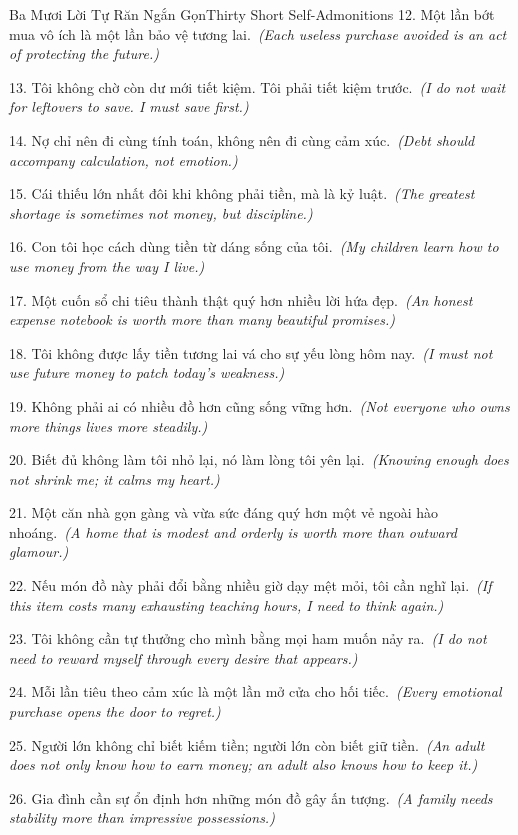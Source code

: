 \begin{truyen}{Ba Mươi Lời Tự Răn Ngắn Gọn}{Thirty Short Self-Admonitions}
12. Một lần bớt mua vô ích là một lần bảo vệ tương lai.\
\textit{(Each useless purchase avoided is an act of protecting the future.)}

13. Tôi không chờ còn dư mới tiết kiệm. Tôi phải tiết kiệm trước.\
\textit{(I do not wait for leftovers to save. I must save first.)}

14. Nợ chỉ nên đi cùng tính toán, không nên đi cùng cảm xúc.\
\textit{(Debt should accompany calculation, not emotion.)}

15. Cái thiếu lớn nhất đôi khi không phải tiền, mà là kỷ luật.\
\textit{(The greatest shortage is sometimes not money, but discipline.)}

16. Con tôi học cách dùng tiền từ dáng sống của tôi.\
\textit{(My children learn how to use money from the way I live.)}

17. Một cuốn sổ chi tiêu thành thật quý hơn nhiều lời hứa đẹp.\
\textit{(An honest expense notebook is worth more than many beautiful promises.)}

18. Tôi không được lấy tiền tương lai vá cho sự yếu lòng hôm nay.\
\textit{(I must not use future money to patch today’s weakness.)}

19. Không phải ai có nhiều đồ hơn cũng sống vững hơn.\
\textit{(Not everyone who owns more things lives more steadily.)}

20. Biết đủ không làm tôi nhỏ lại, nó làm lòng tôi yên lại.\
\textit{(Knowing enough does not shrink me; it calms my heart.)}

21. Một căn nhà gọn gàng và vừa sức đáng quý hơn một vẻ ngoài hào nhoáng.\
\textit{(A home that is modest and orderly is worth more than outward glamour.)}

22. Nếu món đồ này phải đổi bằng nhiều giờ dạy mệt mỏi, tôi cần nghĩ lại.\
\textit{(If this item costs many exhausting teaching hours, I need to think again.)}

23. Tôi không cần tự thưởng cho mình bằng mọi ham muốn nảy ra.\
\textit{(I do not need to reward myself through every desire that appears.)}

24. Mỗi lần tiêu theo cảm xúc là một lần mở cửa cho hối tiếc.\
\textit{(Every emotional purchase opens the door to regret.)}

25. Người lớn không chỉ biết kiếm tiền; người lớn còn biết giữ tiền.\
\textit{(An adult does not only know how to earn money; an adult also knows how to keep it.)}

26. Gia đình cần sự ổn định hơn những món đồ gây ấn tượng.\
\textit{(A family needs stability more than impressive possessions.)}


\end{truyen}
